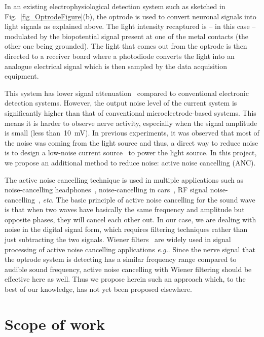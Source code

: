 In an existing electrophysiological  detection system such as sketched in Fig.~\ref{fig_OptrodeFigure}(b), the optrode is used to convert neuronal signals into light signals as explained above.  The light intensity recaptured is -- in this case -- modulated by the biopotential signal present at one of the metal contacts (the other one being grounded). The light that comes out from the optrode is then directed to a receiver board where a photodiode converts the light into an analogue electrical signal which is then sampled by the data acquisition equipment.

This system has lower signal attenuation~\cite{OptrodeArray,ImpedanceOfOptrode} compared to conventional electronic detection systems. However, the output noise level of the current system is significantly higher than that of conventional microelectrode-based systems. This means it is harder to observe nerve activity, especially when the signal amplitude is small (less than~\qty{10}{mV}).  In previous experiments, it was observed that most of the noise was coming from the light source and thus, a direct way to reduce noise is to design a low-noise current source~\cite{LowNoiseCurrentSource} to power the light source.  In this project, we propose an additional method to reduce noise: active noise cancelling (ANC).

The active noise cancelling technique is used in multiple applications such as noise-cancelling headphones~\cite{ANC_Headphone_1,ANC_Headphone_2}, noise-cancelling in cars~\cite{ANC_Car}, RF signal noise-cancelling~\cite{ANC_RF}, {\em etc}.  The basic principle of active noise cancelling for the sound wave is that when two waves have basically the same frequency and amplitude but opposite phases, they will cancel each other out.  In our case, we are dealing with noise in the digital signal form, which requires filtering techniques rather than just subtracting the two signals.  Wiener filters~\cite{WienerFilter} are widely used in signal processing of active noise cancelling applications {\em e.g.}\cite{ANC_Wiener_2,ANC_Wiener_3}.  Since the nerve signal that the optrode system is detecting has a similar frequency range compared to audible sound frequency, active noise cancelling with Wiener filtering should be effective here as well. Thus we propose herein such an approach which, to the best of our knowledge, has not yet been proposed elsewhere.


\section{Scope of work}


